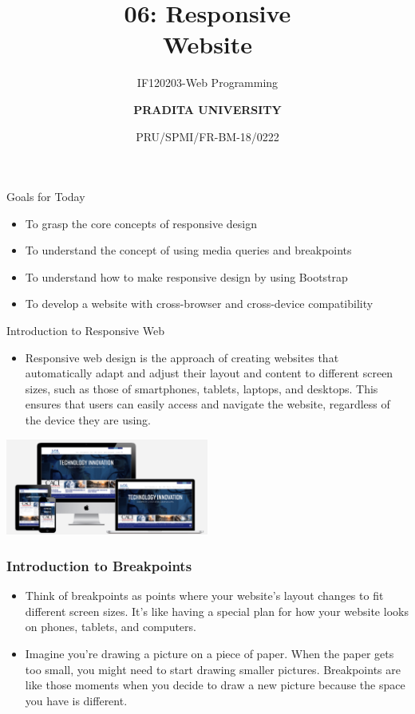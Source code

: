 \documentclass[aspectratio=169, table]{beamer}
\subtitle{IF120203-Web Programming}
\title{\huge {\textbf{06: Responsive\\Website}}}
\date[Serial]{\scriptsize {PRU/SPMI/FR-BM-18/0222}}
\author[Pradita]{\small {\textbf{PRADITA UNIVERSITY}}}
\begin{document}
\begin{frame}
    \titlepage
\end{frame}

\begin{frame}{Goals for Today}
    \vskip-1cm
    \begin{itemize}
        \item To grasp the core concepts of responsive design
        \item To understand the concept of using media queries and breakpoints
        \item To understand how to make responsive design by using Bootstrap 
        \item To develop a website with cross-browser and cross-device compatibility
    \end{itemize}
\end{frame}

\begin{frame}{Introduction to Responsive Web}
    \vskip1cm
    \begin{itemize}
        \item Responsive web design is the approach of creating websites that automatically adapt and adjust their layout and content to different screen sizes, such as those of smartphones, tablets, laptops, and desktops. This ensures that users can easily access and navigate the website, regardless of the device they are using.
    \end{itemize}
    \begin{center}
	\includegraphics[width=0.5\textwidth]{classFiles/responsive-web.png}
    \end{center}
\end{frame}

\begin{frame}[fragile]
	\frametitle{Introduction to Breakpoints}
	\vskip0cm
	 \begin{itemize}
        \item Think of breakpoints as points where your website's layout changes to fit different screen sizes. It's like having a special plan for how your website looks on phones, tablets, and computers.
	\item Imagine you're drawing a picture on a piece of paper. When the paper gets too small, you might need to start drawing smaller pictures. Breakpoints are like those moments when you decide to draw a new picture because the space you have is different.
   	 \end{itemize}
\end{frame}
\end{document}
